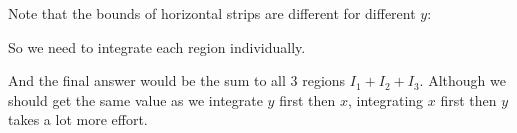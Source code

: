 \documentclass[class=article, crop=false, 12pt]{standalone}
\begin{document}
Note that the bounds of horizontal strips are different for different $y$:


So we need to integrate each region individually.


And the final answer would be the sum to all 3 regions $I_1+I_2+I_3$. 
Although we should get the same value as we integrate $y$ first then $x$,
integrating $x$ first then $y$ takes a lot more effort.


\theend
\end{document}
